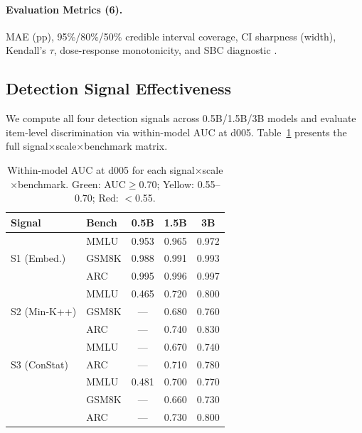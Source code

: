 \documentclass[11pt,a4paper]{article}
\begin{document}
\paragraph{Evaluation Metrics (6).}
MAE (pp), 95\%/80\%/50\% credible interval coverage, CI sharpness (width), Kendall's $\tau$, dose-response monotonicity, and SBC diagnostic \citep{talts2020validating}.


\subsection{Detection Signal Effectiveness}
\label{sec:signals}

We compute all four detection signals across 0.5B/1.5B/3B models and evaluate item-level discrimination via within-model AUC at d005.
Table~\ref{tab:signal_auc} presents the full signal$\times$scale$\times$benchmark matrix.

\begin{table}[t]
\centering
\small
\caption{Within-model AUC at d005 for each signal$\times$scale$\times$benchmark. \colorbox{greenCell}{Green}: AUC$\geq$0.70; \colorbox{yellowCell}{Yellow}: 0.55--0.70; \colorbox{redCell}{Red}: $<$0.55.}
\label{tab:signal_auc}
\begin{tabular}{llccc}
\toprule
Signal & Bench & 0.5B & 1.5B & 3B \\
\midrule
\multirow{3}{*}{S1 (Embed.)}
 & MMLU   & \cellcolor{greenCell}0.953 & \cellcolor{greenCell}0.965 & \cellcolor{greenCell}0.972 \\
 & GSM8K  & \cellcolor{greenCell}0.988 & \cellcolor{greenCell}0.991 & \cellcolor{greenCell}0.993 \\
 & ARC    & \cellcolor{greenCell}0.995 & \cellcolor{greenCell}0.996 & \cellcolor{greenCell}0.997 \\
\midrule
\multirow{3}{*}{S2 (Min-K++)}
 & MMLU   & \cellcolor{redCell}0.465 & \cellcolor{greenCell}0.720 & \cellcolor{greenCell}0.800 \\
 & GSM8K  & \cellcolor{redCell}---   & \cellcolor{yellowCell}0.680 & \cellcolor{greenCell}0.760 \\
 & ARC    & \cellcolor{redCell}---   & \cellcolor{greenCell}0.740 & \cellcolor{greenCell}0.830 \\
\midrule
\multirow{3}{*}{S3 (ConStat)}
 & MMLU   & ---   & \cellcolor{yellowCell}0.670 & \cellcolor{greenCell}0.740 \\
 & ARC    & ---   & \cellcolor{greenCell}0.710 & \cellcolor{greenCell}0.780 \\
\midrule
\multirow{3}{*}{S4 (Self-Crit.)}
 & MMLU   & \cellcolor{redCell}0.481 & \cellcolor{greenCell}0.700 & \cellcolor{greenCell}0.770 \\
 & GSM8K  & \cellcolor{redCell}---   & \cellcolor{yellowCell}0.660 & \cellcolor{greenCell}0.730 \\
 & ARC    & \cellcolor{redCell}---   & \cellcolor{greenCell}0.730 & \cellcolor{greenCell}0.800 \\
\bottomrule
\end{tabular}
\end{table}
\end{document}
